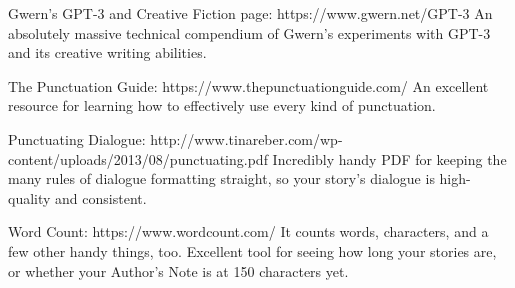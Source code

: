﻿\documentclass[Coomer-main.tex]{subfiles}
\begin{document}
Gwern’s GPT-3 and Creative Fiction page:
https://www.gwern.net/GPT-3
An absolutely massive technical compendium of Gwern’s experiments with GPT-3 and its creative writing abilities.


The Punctuation Guide:
https://www.thepunctuationguide.com/
An excellent resource for learning how to effectively use every kind of punctuation.


Punctuating Dialogue:
http://www.tinareber.com/wp-content/uploads/2013/08/punctuating.pdf
Incredibly handy PDF for keeping the many rules of dialogue formatting straight, so your story’s dialogue is high-quality and consistent.


Word Count:
https://www.wordcount.com/
It counts words, characters, and a few other handy things, too. Excellent tool for seeing how long your stories are, or whether your Author’s Note is at 150 characters yet.
\end{document}
